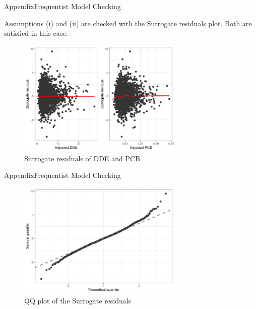 \documentclass{beamer}\usepackage[]{graphicx}\usepackage[]{color}
\begin{document}
\begin{frame}{Appendix}{Frequentist Model Checking}

Assumptions (i) and (ii) are checked with the Surrogate residuals plot. Both are satisfied in this case.
\begin{figure}
  \centering
  \includegraphics[width=0.7\textwidth]{Surrogate_residuals.png}
\caption{Surrogate residuals of DDE and PCB}
\label{fig:surrogateresid}
\end{figure}
\end{frame}
\begin{frame}{Appendix}{Frequentist Model Checking}

\begin{figure}
  \centering
  \includegraphics[width=0.7\textwidth]{qqplot.png}
\caption{QQ plot of the Surrogate residuals}
\label{fig:qqplot}
\end{figure}
\end{frame}
\end{document}
